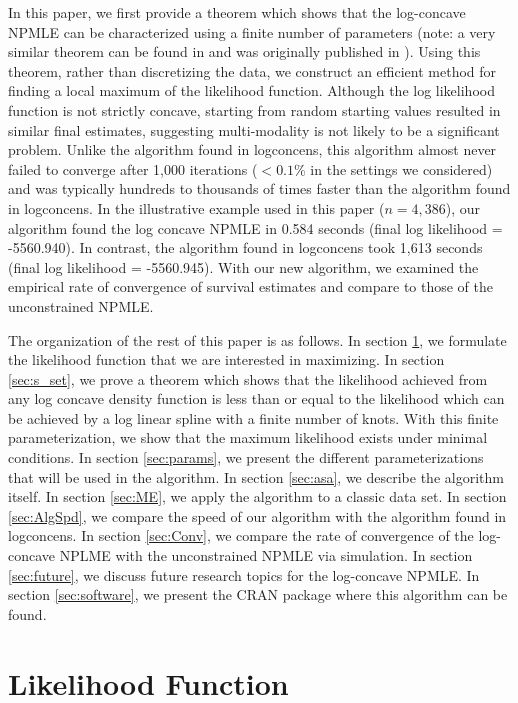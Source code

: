 	In this paper, we first provide a theorem which shows that the log-concave NPMLE can be characterized using a finite number of parameters (note: a very similar theorem can be found in \cite{RefDea2014} and was originally published in \cite{myThesis}). Using this theorem, rather than discretizing the data, we construct an efficient method for finding a local maximum of the likelihood function. Although the log likelihood function is not strictly  concave, starting from random starting values resulted in similar final estimates, suggesting multi-modality is not likely to be a significant problem. Unlike the algorithm found in logconcens, this algorithm almost never failed to converge after 1,000 iterations ($< 0.1\%$ in the settings we considered) and was typically hundreds to thousands of times faster than the algorithm found in logconcens. In the illustrative example used in this paper ($n = 4,386$), our algorithm found the log concave NPMLE in 0.584 seconds (final log likelihood = -5560.940). In contrast, the algorithm found in logconcens took 1,613 seconds (final log likelihood = -5560.945). With our new algorithm, we examined the empirical rate of convergence of survival estimates and compare to those of the unconstrained NPMLE. 
	
	The organization of the rest of this paper is as follows.  In section \ref{sec:llk}, we formulate the likelihood function that we are interested in maximizing. In section \ref{sec:s_set}, we prove a theorem which shows that the likelihood achieved from any log concave density function is less than or equal to the likelihood which can be achieved by a log linear spline with a finite number of knots. With this finite parameterization, we show that the maximum likelihood exists under minimal conditions. In section \ref{sec:params}, we present the different parameterizations that will be used in the algorithm. In section \ref{sec:asa}, we describe the algorithm itself. In section \ref{sec:ME}, we apply the algorithm to a classic data set. In section \ref{sec:AlgSpd}, we compare the speed of our algorithm with the algorithm found in logconcens. In section \ref{sec:Conv}, we compare the rate of convergence of the log-concave NPLME with the unconstrained NPMLE via simulation. In section \ref{sec:future}, we discuss future research topics for the log-concave NPMLE. In section \ref{sec:software}, we present the CRAN package where this algorithm can be found. 
\\

{\section{Likelihood Function}
\label{sec:llk}}

